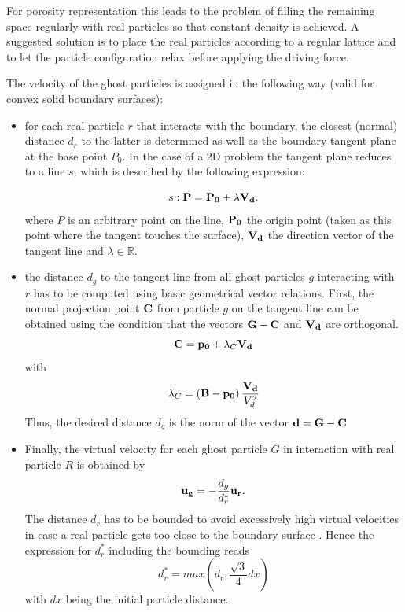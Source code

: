 \documentclass{report}
\begin{document}
\begin{itemize}
For porosity representation this leads to the problem of filling the remaining space regularly with real particles so that constant density is achieved. A suggested solution \cite{Morris1997} is to place the real particles according to a regular lattice and to let the particle configuration relax before applying the driving force. %

The velocity of the ghost particles is assigned in the following way \cite{Zhu1999} (valid for convex solid boundary surfaces): 
\begin{itemize}
\item for each real particle $r$ that interacts with the boundary, the closest (normal) distance $d_r$ to the latter is determined as well as the boundary tangent plane at the base point $P_0$. In the case of a 2D problem the tangent plane reduces to a line $s$, which is described by the following expression:

\begin{equation}
 \label{eq:BoundaryTangentEquation}
s: {\bf P}={\bf P_0}+\lambda {\bf V_d}.
\end{equation}
where $P$ is an arbitrary point on the line, ${\bf P_0}$ the origin point (taken as this point where the tangent touches the surface), ${\bf V_d}$ the direction vector of the tangent line and $\lambda \in \mathbb{R}$.
\item the distance $d_g$ to the tangent line from all ghost particles $g$ interacting with $r$ has to be computed using basic geometrical vector relations. First, the normal projection point ${\bf C}$ from particle $g$ on the tangent line can be obtained using the condition that the vectors ${\bf G}-{\bf C}$ and ${\bf V_d}$ are orthogonal.
\begin{equation}
 {\bf C}={\bf p_0}+\lambda_C {\bf V_d}
\end{equation}
with 
\begin{equation}
 \lambda_C=\left({\bf B}-{\bf p_0}\right)\frac{{\bf V_d}}{V_d^2}
\end{equation}
  Thus, the desired distance $d_g$ is the norm of the vector ${\bf d}={\bf G}-{\bf C}$
\item Finally, the virtual velocity for each ghost particle $G$ in interaction with real particle $R$ is obtained by
\begin{equation}
\label{eq:velocInterpolation}
 {\bf u_g}=-\frac{d_g}{d_r^*} {\bf u_r}.
\end{equation}
The distance $d_r$ has to be bounded to avoid excessively high virtual velocities in case a real particle gets too close to the boundary surface \cite{Zhu1999}. Hence the expression for $d_r^*$ including the bounding reads
\begin{equation}
 d_r^*=\mathit{max}\left(d_r,\frac{\sqrt{3}}{4}dx\right)
\end{equation}
with $dx$ being the initial particle distance.



\end{itemize}
\end{itemize}
\end{document}
